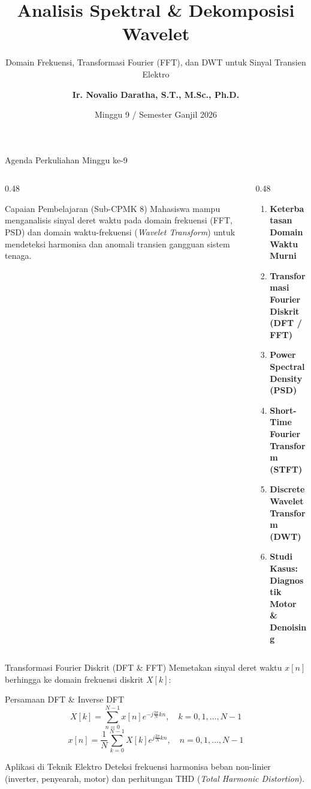 \documentclass[aspectratio=169, 10pt]{beamer}
\title[\textbf{Deret Waktu (Minggu 9)}]{\textbf{Analisis Spektral \& Dekomposisi Wavelet}}
\subtitle{Domain Frekuensi, Transformasi Fourier (FFT), dan DWT untuk Sinyal Transien Elektro}
\author[\textbf{Ir. Novalio Daratha, Ph.D.}]{\textbf{Ir. Novalio Daratha, S.T., M.Sc., Ph.D.}}
\institute[FT UNIB]{Program Studi Teknik Elektro -- Fakultas Teknik\\Universitas Bengkulu}
\date{Minggu 9 / Semester Ganjil 2026}
\begin{document}
\begin{frame}[plain]
    \titlepage
\end{frame}

\begin{frame}{Agenda Perkuliahan Minggu ke-9}
    \begin{columns}[T]
        \begin{column}{0.48\textwidth}
            \begin{block}{Capaian Pembelajaran (Sub-CPMK 8)}
                Mahasiswa mampu menganalisis sinyal deret waktu pada domain frekuensi (FFT, PSD) dan domain waktu-frekuensi (\textit{Wavelet Transform}) untuk mendeteksi harmonisa dan anomali transien gangguan sistem tenaga.
            \end{block}
        \end{column}
        \begin{column}{0.48\textwidth}
            \begin{enumerate}
                \item \textbf{Keterbatasan Domain Waktu Murni}
                \item \textbf{Transformasi Fourier Diskrit (DFT / FFT)}
                \item \textbf{Power Spectral Density (PSD)}
                \item \textbf{Short-Time Fourier Transform (STFT)}
                \item \textbf{Discrete Wavelet Transform (DWT)}
                \item \textbf{Studi Kasus: Diagnostik Motor \& Denoising}
            \end{enumerate}
        \end{column}
    \end{columns}
\end{frame}

\begin{frame}{Transformasi Fourier Diskrit (DFT \& FFT)}
    Memetakan sinyal deret waktu $x[n]$ berhingga ke domain frekuensi diskrit $X[k]$:
    \begin{block}{Persamaan DFT \& Inverse DFT}
        \begin{equation}
            X[k] = \sum_{n=0}^{N-1} x[n] e^{-j \frac{2\pi}{N} k n}, \quad k = 0, 1, \dots, N-1
        \end{equation}
        \begin{equation}
            x[n] = \frac{1}{N} \sum_{k=0}^{N-1} X[k] e^{j \frac{2\pi}{N} k n}, \quad n = 0, 1, \dots, N-1
        \end{equation}
    \end{block}
    \begin{alertblock}{Aplikasi di Teknik Elektro}
        Deteksi frekuensi harmonisa beban non-linier (inverter, penyearah, motor) dan perhitungan THD (\textit{Total Harmonic Distortion}).
    \end{alertblock}
\end{frame}
\end{document}
